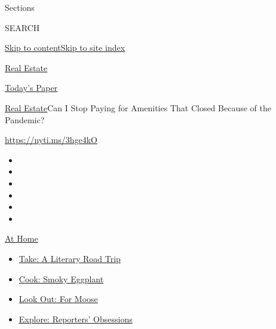 Sections

SEARCH

\protect\hyperlink{site-content}{Skip to
content}\protect\hyperlink{site-index}{Skip to site index}

\href{https://www.nytimes.com/section/realestate}{Real Estate}

\href{https://myaccount.nytimes.com/auth/login?response_type=cookie\&client_id=vi}{}

\href{https://www.nytimes.com/section/todayspaper}{Today's Paper}

\href{/section/realestate}{Real Estate}\textbar{}Can I Stop Paying for
Amenities That Closed Because of the Pandemic?

\url{https://nyti.ms/3hge4kO}

\begin{itemize}
\item
\item
\item
\item
\item
\item
\end{itemize}

\href{https://www.nytimes.com/spotlight/at-home?action=click\&pgtype=Article\&state=default\&region=TOP_BANNER\&context=at_home_menu}{At
Home}

\begin{itemize}
\tightlist
\item
  \href{https://www.nytimes.com/2020/07/28/books/time-for-a-literary-road-trip.html?action=click\&pgtype=Article\&state=default\&region=TOP_BANNER\&context=at_home_menu}{Take:
  A Literary Road Trip}
\item
  \href{https://www.nytimes.com/2020/07/29/magazine/bored-with-your-home-cooking-some-smoky-eggplant-will-fix-that.html?action=click\&pgtype=Article\&state=default\&region=TOP_BANNER\&context=at_home_menu}{Cook:
  Smoky Eggplant}
\item
  \href{https://www.nytimes.com/2020/07/27/travel/moose-michigan-isle-royale.html?action=click\&pgtype=Article\&state=default\&region=TOP_BANNER\&context=at_home_menu}{Look
  Out: For Moose}
\item
  \href{https://www.nytimes.com/interactive/2020/at-home/even-more-reporters-editors-diaries-lists-recommendations.html?action=click\&pgtype=Article\&state=default\&region=TOP_BANNER\&context=at_home_menu}{Explore:
  Reporters' Obsessions}
\end{itemize}

